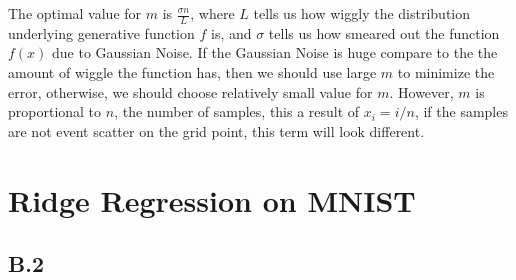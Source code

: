\documentclass[]{article}
\begin{document}
		The optimal value for $m$ is $\frac{\sigma n}{L}$, where $L$ tells us how wiggly the distribution underlying generative function $f$ is, and $\sigma$ tells us how smeared out the function $f(x)$ due to Gaussian Noise. If the Gaussian Noise is huge compare to the the amount of wiggle the function has, then we should use large $m$ to minimize the error, otherwise, we should choose relatively small value for $m$. However, $m$ is proportional to $n$, the number of samples, this a result of $x_i = i/n$, if the samples are not event scatter on the grid point, this term will look different. 
\section*{Ridge Regression on MNIST}
	\subsection*{B.2}
\end{document}
